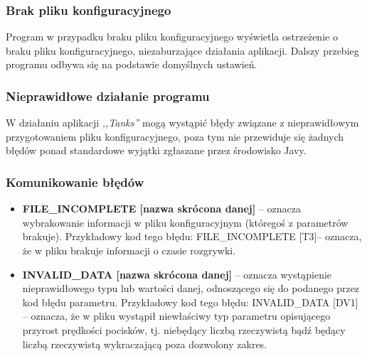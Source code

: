 \documentclass[11pt,a4paper]{report}
\begin{document}
\subsubsection{Brak pliku konfiguracyjnego}
Program w przypadku braku pliku konfiguracyjnego wyświetla ostrzeżenie o braku pliku konfiguracyjnego, niezaburzające działania aplikacji. Dalszy przebieg programu odbywa się na podstawie domyślnych ustawień. 
\subsubsection{Nieprawidłowe działanie programu}
W działaniu aplikacji \textsl{,,Tanks''} mogą wystąpić błędy związane z nieprawidłowym przygotowaniem pliku konfiguracyjnego, poza tym nie przewiduje się żadnych błędów ponad standardowe wyjątki zgłaszane przez środowisko Javy.
\subsubsection{Komunikowanie błędów}


\begin {itemize}
\item\textbf {FILE\_INCOMPLETE [nazwa skrócona danej]} -- oznacza wybrakowanie informacji w pliku konfiguracyjnym (któregoś z parametrów brakuje). Przykładowy kod tego błędu: FILE\_INCOMPLETE [T3]-- oznacza, że w pliku brakuje informacji o czasie rozgrywki.
\item\textbf {INVALID\_DATA [nazwa skrócona danej]} -- oznacza wystąpienie nieprawidłowego typu lub wartości danej, odnoszącego się do podanego przez kod błędu parametru. Przykładowy kod tego błędu: INVALID\_DATA [DV1] -- oznacza, że w pliku wystąpił niewłaściwy typ parametru opisującego przyrost prędkości pocisków, tj. niebędący liczbą rzeczywistą bądź będący liczbą rzeczywistą wykraczającą poza dozwolony zakres.
\end {itemize}
\end{document}
